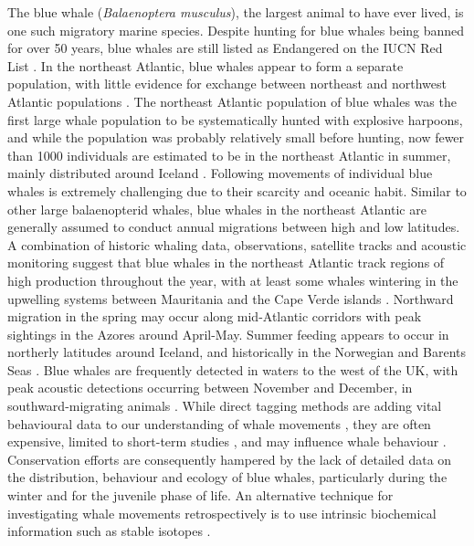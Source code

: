 \documentclass[9pt,twocolumn,twoside,lineno]{pnas-new}
\begin{document}
The blue whale (\textit{Balaenoptera musculus}), the largest animal to have ever lived, is one such migratory marine species. 
Despite hunting for blue whales being banned for over 50 years, blue whales are still listed as Endangered on the IUCN Red List \cite{reilly2008balaenoptera}.
In the northeast Atlantic, blue whales appear to form a separate population, with little evidence for exchange between northeast and northwest Atlantic populations \cite{pike2009note}.  
The northeast Atlantic population of blue whales was the first large whale population to be systematically hunted with explosive harpoons, and while the population was probably relatively small before hunting, now fewer than 1000 individuals are estimated to be in the northeast Atlantic in summer, mainly distributed around Iceland \cite{pike2009note}.
Following movements of individual blue whales is extremely challenging due to their scarcity and oceanic habit.
Similar to other large balaenopterid whales, blue whales in the northeast Atlantic are generally assumed to conduct annual migrations between high and low latitudes. 
A combination of historic whaling data, observations, satellite tracks and acoustic monitoring suggest that blue whales in the northeast Atlantic track regions of high production throughout the year, with at least some whales wintering in the upwelling systems between Mauritania and the Cape Verde islands \cite{baines2014upwellings}.
Northward migration in the spring may occur along mid-Atlantic corridors with peak sightings in the Azores around April-May. Summer feeding appears to occur in northerly latitudes around Iceland, and historically in the Norwegian and Barents Seas \cite{pike2009note}.
Blue whales are frequently detected in waters to the west of the UK, with peak acoustic detections occurring between November and December, in southward-migrating animals \cite{reeves2004historical,baines2017autumn,charif2009acoustic,visser2011timing}.
While direct tagging methods are adding vital behavioural data to our understanding of whale movements \cite{borger15,mcdonald2006biogeographic,bailey2009behavioural,mate2007evolution,silva2013north}, they are often expensive, limited to short-term studies \cite{bailey2009behavioural,best2015tag,mate2007evolution}, and may influence whale behaviour \cite{walker2012review}.
Conservation efforts are consequently hampered by the lack of detailed data on the distribution, behaviour and ecology of blue whales, particularly during the winter and for the juvenile phase of life. 
An alternative technique for investigating whale movements retrospectively is to use intrinsic biochemical information such as stable isotopes \cite{west2006stable,busquets2017estimating,hobson2008tracking}. 
\end{document}
